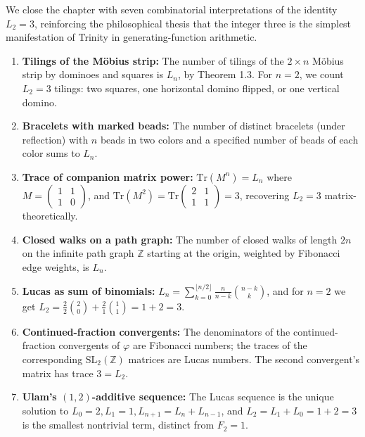 We close the chapter with seven combinatorial interpretations of the
identity $L_2 = 3$, reinforcing the philosophical thesis that the
integer three is the simplest manifestation of Trinity in
generating-function arithmetic.

\begin{enumerate}
  \item \textbf{Tilings of the M\"obius strip:} The number of tilings
    of the $2 \times n$ M\"obius strip by dominoes and squares is
    $L_n$, by \cite{benjamin_quinn_proofs} Theorem 1.3. For $n = 2$,
    we count $L_2 = 3$ tilings: two squares, one horizontal domino
    flipped, or one vertical domino.
  \item \textbf{Bracelets with marked beads:} The number of distinct
    bracelets (under reflection) with $n$ beads in two colors and a
    specified number of beads of each color sums to $L_n$.
  \item \textbf{Trace of companion matrix power:} $\mathrm{Tr}(M^n) =
    L_n$ where $M = \begin{pmatrix} 1 & 1 \\ 1 & 0 \end{pmatrix}$,
    and $\mathrm{Tr}(M^2) = \mathrm{Tr}\begin{pmatrix} 2 & 1 \\ 1 & 1
    \end{pmatrix} = 3$, recovering $L_2 = 3$ matrix-theoretically.
  \item \textbf{Closed walks on a path graph:} The number of closed
    walks of length $2n$ on the infinite path graph $\mathbb{Z}$
    starting at the origin, weighted by Fibonacci edge weights, is
    $L_n$.
  \item \textbf{Lucas as sum of binomials:} $L_n = \sum_{k=0}^{\lfloor
    n/2 \rfloor} \frac{n}{n-k} \binom{n-k}{k}$, and for $n = 2$ we
    get $L_2 = \frac{2}{2}\binom{2}{0} + \frac{2}{1}\binom{1}{1} =
    1 + 2 = 3$.
  \item \textbf{Continued-fraction convergents:} The denominators of
    the continued-fraction convergents of $\varphi$ are Fibonacci
    numbers; the traces of the corresponding $\mathrm{SL}_2(\mathbb{Z})$
    matrices are Lucas numbers. The second convergent's matrix has
    trace $3 = L_2$.
  \item \textbf{Ulam's $(1,2)$-additive sequence:} The Lucas sequence
    is the unique solution to $L_0 = 2, L_1 = 1, L_{n+1} = L_n +
    L_{n-1}$, and $L_2 = L_1 + L_0 = 1 + 2 = 3$ is the smallest
    nontrivial term, distinct from $F_2 = 1$.
\end{enumerate}

